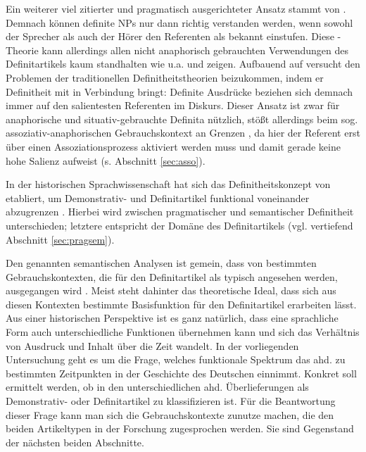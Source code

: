 Ein weiterer viel zitierter und pragmatisch ausgerichteter Ansatz stammt von \textcite{Christophersen1939}. Demnach können definite NPs nur dann richtig verstanden werden, wenn sowohl der Sprecher als auch der Hörer den Referenten als bekannt einstufen. Diese -Theorie kann allerdings allen nicht anaphorisch gebrauchten Verwendungen des Definitartikels kaum standhalten wie u.a. \textcite{Hawkins1978} und \textcite{Lobner1985} zeigen. Aufbauend auf \textcite{Lewis1970} versucht \textcite{vonHeusinger1996} den Problemen der traditionellen Definitheitstheorien beizukommen, indem er Definitheit mit  in Verbindung bringt: Definite Ausdrücke beziehen sich demnach immer auf den salientesten Referenten im Diskurs. Dieser Ansatz ist zwar für anaphorische und situativ-gebrauchte Definita nützlich, stößt allerdings beim sog. assoziativ-anaphorischen Gebrauchskontext an Grenzen \parencite[s. auch][144--149]{Cui2014}, da hier der Referent erst über einen Assoziationsprozess aktiviert werden muss und damit gerade keine hohe Salienz aufweist (s. Abschnitt \ref{sec:asso}).

In der historischen Sprachwissenschaft hat sich das Definitheitskonzept von \textcite{Lobner1985} etabliert, um Demonstrativ- und Definitartikel funktional voneinander abzugrenzen \parencite{Demske2001,Szczepaniak2011a,Schlachter2015}. Hierbei wird zwischen pragmatischer und semantischer Definitheit unterschieden; letztere entspricht der Domäne des Definitartikels (vgl. vertiefend Abschnitt \ref{sec:pragsem}). 

Den genannten  semantischen Analysen ist gemein, dass von bestimmten Gebrauchskontexten, die für den Definitartikel als typisch angesehen werden, ausgegangen wird \parencite[9]{Cui2014}. Meist steht dahinter das theoretische Ideal, dass sich aus diesen Kontexten  bestimmte Basisfunktion für den Definitartikel erarbeiten lässt. Aus einer historischen Perspektive ist es ganz natürlich, dass eine sprachliche Form auch unterschiedliche Funktionen übernehmen kann und sich das Verhältnis von Ausdruck und Inhalt über die Zeit wandelt. In der vorliegenden Untersuchung geht es um die Frage, welches funktionale Spektrum das ahd.  zu bestimmten Zeitpunkten in der Geschichte des Deutschen einnimmt. Konkret soll ermittelt werden, ob  in den unterschiedlichen ahd. Überlieferungen als Demonstrativ- oder Definitartikel zu klassifizieren ist. Für die Beantwortung dieser Frage kann man sich die Gebrauchskontexte zunutze machen, die den beiden Artikeltypen in der Forschung zugesprochen werden. Sie sind Gegenstand der nächsten beiden Abschnitte. 


